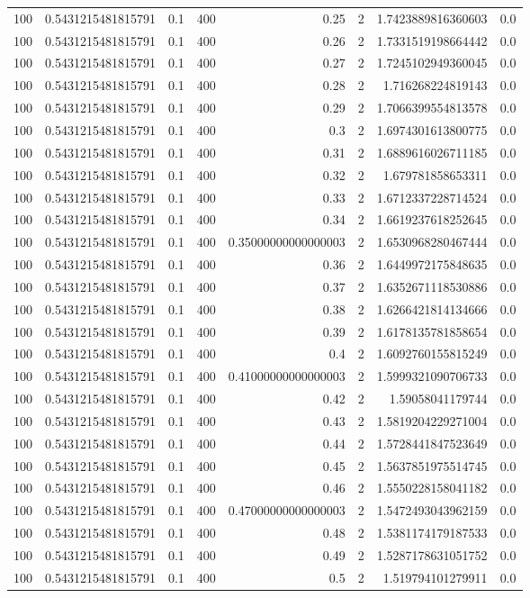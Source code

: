 \documentclass[11pt]{article}
\begin{document}
\begin{center}
\begin{tabular}{rrrrrrrr}
100 & 0.5431215481815791 & 0.1 & 400 & 0.25 & 2 & 1.7423889816360603 & 0.0\\
100 & 0.5431215481815791 & 0.1 & 400 & 0.26 & 2 & 1.7331519198664442 & 0.0\\
100 & 0.5431215481815791 & 0.1 & 400 & 0.27 & 2 & 1.7245102949360045 & 0.0\\
100 & 0.5431215481815791 & 0.1 & 400 & 0.28 & 2 & 1.716268224819143 & 0.0\\
100 & 0.5431215481815791 & 0.1 & 400 & 0.29 & 2 & 1.7066399554813578 & 0.0\\
100 & 0.5431215481815791 & 0.1 & 400 & 0.3 & 2 & 1.6974301613800775 & 0.0\\
100 & 0.5431215481815791 & 0.1 & 400 & 0.31 & 2 & 1.6889616026711185 & 0.0\\
100 & 0.5431215481815791 & 0.1 & 400 & 0.32 & 2 & 1.679781858653311 & 0.0\\
100 & 0.5431215481815791 & 0.1 & 400 & 0.33 & 2 & 1.6712337228714524 & 0.0\\
100 & 0.5431215481815791 & 0.1 & 400 & 0.34 & 2 & 1.6619237618252645 & 0.0\\
100 & 0.5431215481815791 & 0.1 & 400 & 0.35000000000000003 & 2 & 1.6530968280467444 & 0.0\\
100 & 0.5431215481815791 & 0.1 & 400 & 0.36 & 2 & 1.6449972175848635 & 0.0\\
100 & 0.5431215481815791 & 0.1 & 400 & 0.37 & 2 & 1.6352671118530886 & 0.0\\
100 & 0.5431215481815791 & 0.1 & 400 & 0.38 & 2 & 1.6266421814134666 & 0.0\\
100 & 0.5431215481815791 & 0.1 & 400 & 0.39 & 2 & 1.6178135781858654 & 0.0\\
100 & 0.5431215481815791 & 0.1 & 400 & 0.4 & 2 & 1.6092760155815249 & 0.0\\
100 & 0.5431215481815791 & 0.1 & 400 & 0.41000000000000003 & 2 & 1.5999321090706733 & 0.0\\
100 & 0.5431215481815791 & 0.1 & 400 & 0.42 & 2 & 1.59058041179744 & 0.0\\
100 & 0.5431215481815791 & 0.1 & 400 & 0.43 & 2 & 1.5819204229271004 & 0.0\\
100 & 0.5431215481815791 & 0.1 & 400 & 0.44 & 2 & 1.5728441847523649 & 0.0\\
100 & 0.5431215481815791 & 0.1 & 400 & 0.45 & 2 & 1.5637851975514745 & 0.0\\
100 & 0.5431215481815791 & 0.1 & 400 & 0.46 & 2 & 1.5550228158041182 & 0.0\\
100 & 0.5431215481815791 & 0.1 & 400 & 0.47000000000000003 & 2 & 1.5472493043962159 & 0.0\\
100 & 0.5431215481815791 & 0.1 & 400 & 0.48 & 2 & 1.5381174179187533 & 0.0\\
100 & 0.5431215481815791 & 0.1 & 400 & 0.49 & 2 & 1.5287178631051752 & 0.0\\
100 & 0.5431215481815791 & 0.1 & 400 & 0.5 & 2 & 1.519794101279911 & 0.0\\
\hline
\end{tabular}
\end{center}
\end{document}
